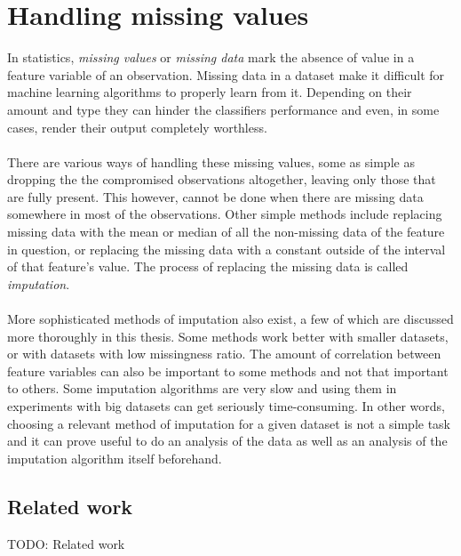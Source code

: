 \documentclass[11pt]{article}
\begin{document}
  \section{Handling missing values}
    In statistics, {\it missing values} or {\it missing data} mark the absence of value in a feature variable of an observation. Missing data in a dataset make it difficult for machine learning algorithms to properly learn from it. Depending on their amount and type they can hinder the classifiers performance and even, in some cases, render their output completely worthless.
    \\~\\
    There are various ways of handling these missing values, some as simple as dropping the the compromised observations altogether, leaving only those that are fully present. This however, cannot be done when there are missing data somewhere in most of the observations. Other simple methods include replacing missing data with the mean or median of all the non-missing data of the feature in question, or replacing the missing data with a constant outside of the interval of that feature's value. The process of replacing the missing data is called {\it imputation}.
    \\~\\
    More sophisticated methods of imputation also exist, a few of which are discussed more thoroughly in this thesis. Some methods work better with smaller datasets, or with datasets with low missingness ratio. The amount of correlation between feature variables can also be important to some methods and not that important to others. Some imputation algorithms are very slow and using them in experiments with big datasets can get seriously time-consuming. In other words, choosing a relevant method of imputation for a given dataset is not a simple task and it can prove useful to do an analysis of the data as well as an analysis of the imputation algorithm itself beforehand.
    \subsection{Related work}
      TODO: Related work
\end{document}
